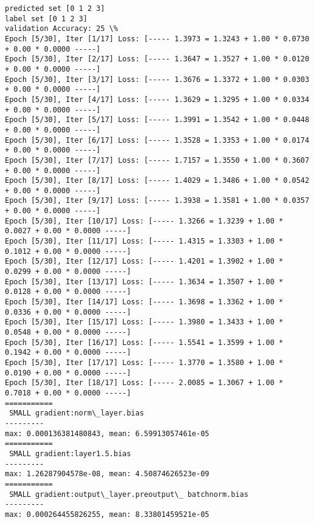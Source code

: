 \documentclass[11pt]{article}
\begin{document}
    \begin{Verbatim}[commandchars=\\\{\}]
predicted set [0 1 2 3]
label set [0 1 2 3]
validation Accuracy: 25 \%
Epoch [5/30], Iter [1/17] Loss: [----- 1.3973 = 1.3243 + 1.00 * 0.0730 + 0.00 * 0.0000 -----]
Epoch [5/30], Iter [2/17] Loss: [----- 1.3647 = 1.3527 + 1.00 * 0.0120 + 0.00 * 0.0000 -----]
Epoch [5/30], Iter [3/17] Loss: [----- 1.3676 = 1.3372 + 1.00 * 0.0303 + 0.00 * 0.0000 -----]
Epoch [5/30], Iter [4/17] Loss: [----- 1.3629 = 1.3295 + 1.00 * 0.0334 + 0.00 * 0.0000 -----]
Epoch [5/30], Iter [5/17] Loss: [----- 1.3991 = 1.3542 + 1.00 * 0.0448 + 0.00 * 0.0000 -----]
Epoch [5/30], Iter [6/17] Loss: [----- 1.3528 = 1.3353 + 1.00 * 0.0174 + 0.00 * 0.0000 -----]
Epoch [5/30], Iter [7/17] Loss: [----- 1.7157 = 1.3550 + 1.00 * 0.3607 + 0.00 * 0.0000 -----]
Epoch [5/30], Iter [8/17] Loss: [----- 1.4029 = 1.3486 + 1.00 * 0.0542 + 0.00 * 0.0000 -----]
Epoch [5/30], Iter [9/17] Loss: [----- 1.3938 = 1.3581 + 1.00 * 0.0357 + 0.00 * 0.0000 -----]
Epoch [5/30], Iter [10/17] Loss: [----- 1.3266 = 1.3239 + 1.00 * 0.0027 + 0.00 * 0.0000 -----]
Epoch [5/30], Iter [11/17] Loss: [----- 1.4315 = 1.3303 + 1.00 * 0.1012 + 0.00 * 0.0000 -----]
Epoch [5/30], Iter [12/17] Loss: [----- 1.4201 = 1.3902 + 1.00 * 0.0299 + 0.00 * 0.0000 -----]
Epoch [5/30], Iter [13/17] Loss: [----- 1.3634 = 1.3507 + 1.00 * 0.0128 + 0.00 * 0.0000 -----]
Epoch [5/30], Iter [14/17] Loss: [----- 1.3698 = 1.3362 + 1.00 * 0.0336 + 0.00 * 0.0000 -----]
Epoch [5/30], Iter [15/17] Loss: [----- 1.3980 = 1.3433 + 1.00 * 0.0548 + 0.00 * 0.0000 -----]
Epoch [5/30], Iter [16/17] Loss: [----- 1.5541 = 1.3599 + 1.00 * 0.1942 + 0.00 * 0.0000 -----]
Epoch [5/30], Iter [17/17] Loss: [----- 1.3770 = 1.3580 + 1.00 * 0.0190 + 0.00 * 0.0000 -----]
Epoch [5/30], Iter [18/17] Loss: [----- 2.0085 = 1.3067 + 1.00 * 0.7018 + 0.00 * 0.0000 -----]
===========
 SMALL gradient:norm\_layer.bias
---------
max: 0.000136381480843, mean: 6.59913057461e-05
===========
 SMALL gradient:layer1.5.bias
---------
max: 1.26287904578e-08, mean: 4.50874626523e-09
===========
 SMALL gradient:output\_layer.preoutput\_ batchnorm.bias
---------
max: 0.000264455826255, mean: 8.33801459521e-05

    \end{Verbatim}

    \begin{center}
    \end{center}
    { \hspace*{\fill} \\}
    
\end{document}
